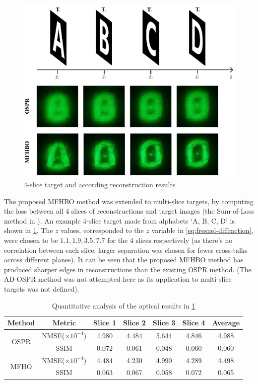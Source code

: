 	\begin{figure}[h!t]
		\centering
		\includegraphics[width=1.0\textwidth]{MFHO_OSPR_ABCD.pdf}
		\caption{4-slice target and according reconstruction results}
		\label{fig:MFHO_OSPR_ABCD}
	\end{figure}

	The proposed MFHBO method was extended to multi-slice targets, by computing the loss between all 4 slices of reconstructions and target images (the Sum-of-Loss method in \cite{Sha2023}). An example 4-slice target made from alphabets `A, B, C, D' is shown in \cref{fig:MFHO_OSPR_ABCD}. The $z$ values, corresponded to the $z$ variable in \cref{eq:fresnel-diffraction}, were chosen to be $1.1, 1.9, 3.5, 7.7$ for the 4 slices respectively (as there's no correlation between each slice, larger separation was chosen for fewer cross-talks across different planes). It can be seen that the proposed MFHBO method has produced sharper edges in reconstructions than the existing OSPR method. (The AD-OSPR method was not attempted here as its application to multi-slice targets was not defined).

	\begin{table}[H]
	\centering
	\begin{tabular}{|c|c|c|c|c|c|c|}
	\hline
	\textbf{Method} & \textbf{Metric} & \textbf{Slice 1} & \textbf{Slice 2} & \textbf{Slice 3} & \textbf{Slice 4} & \textbf{Average} \\ \hline
	\multirow{2}{*}{OSPR} & NMSE($\times 10^{-4}$) & 4.980 & 4.484 & 5.644 & 4.846 & 4.988 \\ \cline{2-7}
						  & SSIM                   & 0.072 & 0.061 & 0.048 & 0.060 & 0.060 \\ \hline
	\multirow{2}{*}{MFHO} & NMSE($\times 10^{-4}$) & 4.484 & 4.230 & 4.990 & 4.289 & 4.498 \\ \cline{2-7}
						  & SSIM                   & 0.063 & 0.067 & 0.058 & 0.072 & 0.065 \\ \hline
	\end{tabular}
	\caption{Quantitative analysis of the optical results in \cref{fig:MFHO_OSPR_ABCD}}
	\label{tab:quant_MFHO_OSPR_ABCD}
	\end{table}

